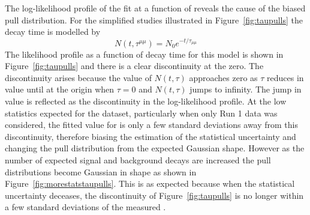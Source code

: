 The log-likelihood profile of the  fit at a function of \tmumu reveals the cause of the biased pull distribution. For the simplified studies illustrated in Figure~\ref{fig:taupulls} the decay time is modelled by
\begin{equation}
N(t, \tau^{\mu \mu}) = N_{0}e^{-t/\tau_{\mu\mu}}
\end{equation}
The likelihood profile as a function of decay time for this model is shown in Figure~\ref{fig:taupulls} and there is a clear discontinuity at the zero. The discontinuity arises because the value of $N(t, \tau)$ approaches zero as $\tau$ reduces in value until at the origin when $\tau = 0$ and $N(t, \tau)$ jumps to infinity. The jump in value is reflected as the discontinuity in the log-likelihood profile. At the low statistics expected for the dataset, particularly when only Run 1 data was considered, the fitted value for \tmumu is only a few standard deviations away from this discontinuity, therefore biasing the estimation of the statistical uncertainty and changing the pull distribution from the expected Gaussian shape. However as the number of expected signal and background decays are increased the \tmumu pull distributions become Gaussian in shape as shown in Figure~\ref{fig:morestatstaupulls}. This is as expected because when the statistical uncertainty deceases, the discontinuity of Figure~\ref{fig:taupulls} is no longer within a few standard deviations of the measured \tmumu.



